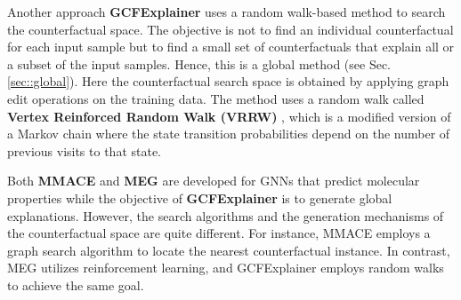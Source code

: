 Another approach \textbf{GCFExplainer} \cite{Global-counter} uses a random walk-based method to search the counterfactual space. The objective is not to find an individual counterfactual for each input sample but to find a small set of counterfactuals that explain all or a subset of the input samples. Hence, this is a global method (see Sec. \ref{sec::global}). Here the counterfactual search space is obtained by applying graph edit operations on the training data. The method uses a  random walk called \textbf{Vertex Reinforced Random Walk (VRRW)} \cite{pemantle1992vertex}, which is a modified version of a Markov chain where the state transition probabilities depend on the number of previous visits to that state.




Both \textbf{MMACE} \cite{agnostic-counter} and \textbf{MEG} \cite{meg-counter} are developed for GNNs that predict molecular properties while the objective of \textbf{GCFExplainer} \cite{Global-counter} is to generate global explanations. However, the search algorithms and the generation mechanisms of the counterfactual space are quite different. For instance, MMACE employs a graph search algorithm to locate the nearest counterfactual instance. In contrast, MEG utilizes reinforcement learning, and GCFExplainer employs random walks to achieve the same goal.


